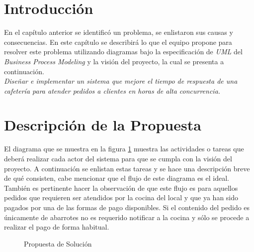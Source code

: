 \section{Introducción}

En el capítulo anterior se identificó un problema, se enlistaron sus causas y consecuencias. En este capítulo se describirá lo que el equipo propone para resolver este problema utilizando diagramas bajo la especificación de \textit{UML} del \textit{Business Process Modeling} y la visión del proyecto, la cual se presenta a continuación.\\

{\em{Diseñar e implementar un sistema que mejore el tiempo de respuesta de una cafetería para atender pedidos a clientes en horas de alta concurrencia.\\}}

\section{Descripción de la Propuesta}
El diagrama que se muestra en la figura \ref{fig:bpmn} muestra las actividades o tareas que deberá realizar cada actor del sistema para que se cumpla con la visión del proyecto. A continuación se enlistan estas tareas y se hace una descripción breve de qué consisten, cabe mencionar que el flujo de este diagrama es el ideal. También es pertinente hacer la observación de que este flujo es para aquellos pedidos que requieren ser atendidos por la cocina del local y que ya han sido pagados por una de las formas de pago disponibles. Si el contenido del pedido es únicamente de abarrotes no es requerido notificar a la cocina y sólo se procede a realizar el pago de forma habitual.

\begin{figure}[hbtp!]
	\begin{center}
		\caption{Propuesta de Solución}
		\label{fig:bpmn}
	\end{center}
\end{figure}

